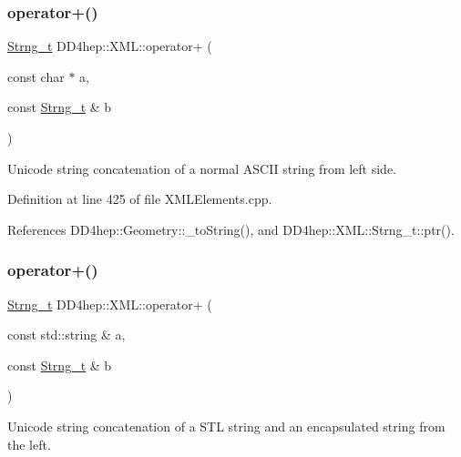 \subsubsection{\texorpdfstring{operator+()}{operator+()}\hspace{0.1cm}{\footnotesize\ttfamily [4/14]}}
{\footnotesize\ttfamily \hyperlink{class_d_d4hep_1_1_x_m_l_1_1_strng__t}{Strng\+\_\+t} D\+D4hep\+::\+X\+M\+L\+::operator+ (\begin{DoxyParamCaption}\item[{const char $\ast$}]{a,  }\item[{const \hyperlink{class_d_d4hep_1_1_x_m_l_1_1_strng__t}{Strng\+\_\+t} \&}]{b }\end{DoxyParamCaption})}



Unicode string concatenation of a normal A\+S\+C\+II string from left side. 



Definition at line 425 of file X\+M\+L\+Elements.\+cpp.



References D\+D4hep\+::\+Geometry\+::\+\_\+to\+String(), and D\+D4hep\+::\+X\+M\+L\+::\+Strng\+\_\+t\+::ptr().

\hypertarget{group___d_d4_h_e_p___x_m_l_gab7183a795b02243de6de9f3cd3665cb0}{}\label{group___d_d4_h_e_p___x_m_l_gab7183a795b02243de6de9f3cd3665cb0} 
\subsubsection{\texorpdfstring{operator+()}{operator+()}\hspace{0.1cm}{\footnotesize\ttfamily [5/14]}}
{\footnotesize\ttfamily \hyperlink{class_d_d4hep_1_1_x_m_l_1_1_strng__t}{Strng\+\_\+t} D\+D4hep\+::\+X\+M\+L\+::operator+ (\begin{DoxyParamCaption}\item[{const std\+::string \&}]{a,  }\item[{const \hyperlink{class_d_d4hep_1_1_x_m_l_1_1_strng__t}{Strng\+\_\+t} \&}]{b }\end{DoxyParamCaption})}



Unicode string concatenation of a S\+TL string and an encapsulated string from the left. 



